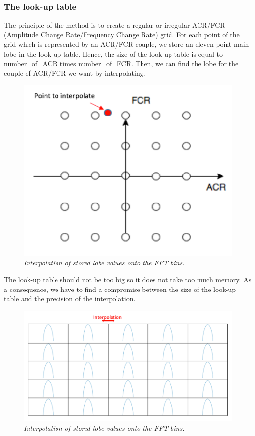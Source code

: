 \documentclass[]{article}
\begin{document}
\subsubsection{The look-up table}\label{The look-up table}
\hspace{15pt}
The principle of the method is to create a regular or irregular ACR/FCR (Amplitude Change Rate/Frequency Change Rate) grid. For each point of the grid which is represented by an ACR/FCR couple, we store an eleven-point main lobe in the look-up table. Hence, the size of the look-up table is equal to number\_of\_ACR times number\_of\_FCR. Then, we can find the lobe for the couple of ACR/FCR we want by interpolating.
\begin{figure}[H]
	\centering
	\includegraphics[scale=0.6]{grid.png}
	\caption{\it Interpolation of stored lobe values onto the FFT bins.}
\end{figure}

The look-up table should not be too big so it does not take too much memory. As a consequence, we have to find a compromise between the size of the look-up table and the precision of the interpolation.

\begin{figure}[H]
	\centering
	\includegraphics[scale=0.8]{LUT.png}
	\caption{\it Interpolation of stored lobe values onto the FFT bins.}
\end{figure}
\end{document}
